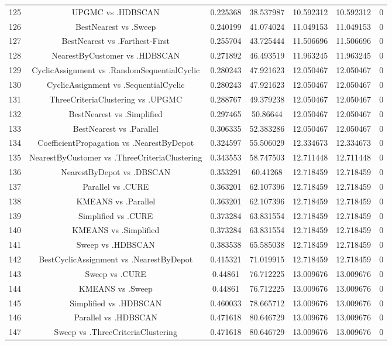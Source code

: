 \documentclass[a4paper,10pt]{article}
\begin{document}
\begin{landscape}
\begin{table}[!htp]
\begin{tabular}{ccccccc}
125&UPGMC vs .HDBSCAN&0.225368&38.537987&10.592312&10.592312&0\\
126&BestNearest vs .Sweep&0.240199&41.074024&11.049153&11.049153&0\\
127&BestNearest vs .Farthest-First&0.255704&43.725444&11.506696&11.506696&0\\
128&NearestByCustomer vs .HDBSCAN&0.271892&46.493519&11.963245&11.963245&0\\
129&CyclicAssignment vs .RandomSequentialCyclic&0.280243&47.921623&12.050467&12.050467&0\\
130&CyclicAssignment vs .SequentialCyclic&0.280243&47.921623&12.050467&12.050467&0\\
131&ThreeCriteriaClustering vs .UPGMC&0.288767&49.379238&12.050467&12.050467&0\\
132&BestNearest vs .Simplified&0.297465&50.86644&12.050467&12.050467&0\\
133&BestNearest vs .Parallel&0.306335&52.383286&12.050467&12.050467&0\\
134&CoefficientPropagation vs .NearestByDepot&0.324597&55.506029&12.334673&12.334673&0\\
135&NearestByCustomer vs .ThreeCriteriaClustering&0.343553&58.747503&12.711448&12.711448&0\\
136&NearestByDepot vs .DBSCAN&0.353291&60.41268&12.718459&12.718459&0\\
137&Parallel vs .CURE&0.363201&62.107396&12.718459&12.718459&0\\
138&KMEANS vs .Parallel&0.363201&62.107396&12.718459&12.718459&0\\
139&Simplified vs .CURE&0.373284&63.831554&12.718459&12.718459&0\\
140&KMEANS vs .Simplified&0.373284&63.831554&12.718459&12.718459&0\\
141&Sweep vs .HDBSCAN&0.383538&65.585038&12.718459&12.718459&0\\
142&BestCyclicAssignment vs .NearestByDepot&0.415321&71.019915&12.718459&12.718459&0\\
143&Sweep vs .CURE&0.44861&76.712225&13.009676&13.009676&0\\
144&KMEANS vs .Sweep&0.44861&76.712225&13.009676&13.009676&0\\
145&Simplified vs .HDBSCAN&0.460033&78.665712&13.009676&13.009676&0\\
146&Parallel vs .HDBSCAN&0.471618&80.646729&13.009676&13.009676&0\\
147&Sweep vs .ThreeCriteriaClustering&0.471618&80.646729&13.009676&13.009676&0\\

\end{tabular}
\end{table}
\end{landscape}
\end{document}
